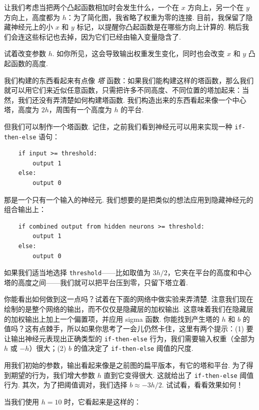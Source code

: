 让我们考虑当把两个凸起函数相加时会发生什么，一个在 $x$ 方向上，另一个在 $y$ 方向上，高度都为 $h$：为了简化图，我省略了权重为零的连接. 目前，我保留了隐藏神经元上的小 $x$ 和 $y$ 标记，以提醒你凸起函数是在哪些方向上计算的. 稍后我们会连这些标记也去掉，因为它们已经由输入变量隐含了.

试着改变参数 $h$. 如你所见，这会导致输出权重发生变化，同时也会改变 $x$ 和 $y$ 凸起函数的高度.

我们构建的东西看起来有点像 \emph{塔} 函数：如果我们能构建这样的塔函数，那么我们就可以用它们来近似任意函数，只需把许多不同高度、不同位置的塔加起来：当然，我们还没有弄清楚如何构建塔函数. 我们构造出来的东西看起来像一个中心塔，高度为 $2h$，周围有一个高度为 $h$ 的平台.

但我们可以制作一个塔函数. 记住，之前我们看到神经元可以用来实现一种 \texttt{if-then-else} 语句：

\begin{lstlisting}
    if input >= threshold:
        output 1
    else:
        output 0

\end{lstlisting}

那是一个只有一个输入的神经元. 我们想要的是把类似的想法应用到隐藏神经元的组合输出上：

\begin{lstlisting}
    if combined output from hidden neurons >= threshold:
        output 1
    else:
        output 0

\end{lstlisting}

如果我们适当地选择 \texttt{threshold}——比如取值为 $3h/2$，它夹在平台的高度和中心塔的高度之间——我们就可以把平台压到零，只留下塔立着.

你能看出如何做到这一点吗？试着在下面的网络中做实验来弄清楚. 注意我们现在绘制的是整个网络的输出，而不仅仅是隐藏层的加权输出. 这意味着我们在隐藏层的加权输出上加上一个偏置项，并应用 sigma 函数. 你能找到产生塔的 $h$ 和 $b$ 的值吗？这有点棘手，所以如果你思考了一会儿仍然卡住，这里有两个提示：(1) 要让输出神经元表现出正确类型的 \texttt{if-then-else} 行为，我们需要输入权重（全部为 $h$ 或 $-h$）很大；(2) $b$ 的值决定了 \texttt{if-then-else} 阈值的尺度.

用我们初始的参数，输出看起来像是之前图的扁平版本，有它的塔和平台. 为了得到期望的行为，我们增大参数 $h$ 直到它变得很大. 这就给出了 \texttt{if-then-else} 阈值行为. 其次，为了把阈值调对，我们选择 $b \approx -3h/2$. 试试看，看看效果如何！

当我们使用 $h = 10$ 时，它看起来是这样的：

